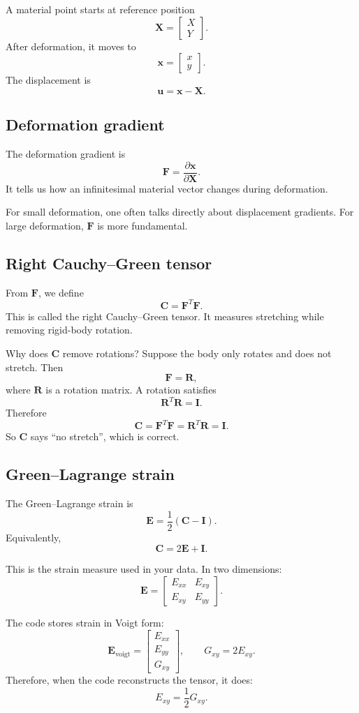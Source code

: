 \documentclass[11pt]{article}
\newcommand{\E}{\bm{E}}
\newcommand{\F}{\bm{F}}
\newcommand{\C}{\bm{C}}
\newcommand{\I}{\bm{I}}
\newcommand{\X}{\bm{X}}
\newcommand{\x}{\bm{x}}
\newcommand{\uvec}{\bm{u}}
\begin{document}
A material point starts at reference position
\[
  \X =
  \begin{bmatrix}
    X \\ Y
  \end{bmatrix}.
\]
After deformation, it moves to
\[
  \x =
  \begin{bmatrix}
    x \\ y
  \end{bmatrix}.
\]
The displacement is
\[
  \uvec = \x - \X.
\]

\subsection{Deformation gradient}

The deformation gradient is
\[
  \F = \frac{\partial \x}{\partial \X}.
\]
It tells us how an infinitesimal material vector changes during deformation.

For small deformation, one often talks directly about displacement gradients.
For large deformation, $\F$ is more fundamental.

\subsection{Right Cauchy--Green tensor}

From $\F$, we define
\[
  \C = \F^T \F.
\]
This is called the right Cauchy--Green tensor. It measures stretching while
removing rigid-body rotation.

Why does $\C$ remove rotations? Suppose the body only rotates and does not
stretch. Then
\[
  \F = \bm{R},
\]
where $\bm{R}$ is a rotation matrix. A rotation satisfies
\[
  \bm{R}^T\bm{R} = \I.
\]
Therefore
\[
  \C = \F^T\F = \bm{R}^T\bm{R} = \I.
\]
So $\C$ says ``no stretch'', which is correct.

\subsection{Green--Lagrange strain}

The Green--Lagrange strain is
\[
  \E = \frac{1}{2}(\C-\I).
\]
Equivalently,
\[
  \C = 2\E + \I.
\]

This is the strain measure used in your data. In two dimensions:
\[
  \E =
  \begin{bmatrix}
    E_{xx} & E_{xy} \\
    E_{xy} & E_{yy}
  \end{bmatrix}.
\]

The code stores strain in Voigt form:
\[
  \E_{\mathrm{voigt}}
  =
  \begin{bmatrix}
    E_{xx} \\
    E_{yy} \\
    G_{xy}
  \end{bmatrix},
  \qquad
  G_{xy}=2E_{xy}.
\]
Therefore, when the code reconstructs the tensor, it does:
\[
  E_{xy} = \frac{1}{2}G_{xy}.
\]
\end{document}
